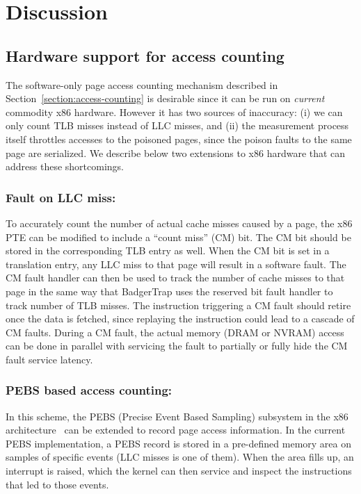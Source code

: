 \section{Discussion}
\label{discussion}

\subsection{Hardware support for access counting}
\label{counting_hardware}
The software-only page access counting mechanism described in
Section~\ref{section:access-counting} is desirable since it can be run on {\it
current} commodity x86 hardware. However it has two sources of inaccuracy: (i)
we can only count TLB misses instead of LLC misses, and (ii) the measurement
process itself throttles accesses to the poisoned pages, since the poison faults
to the same page are serialized. We describe below two extensions to x86
hardware that can address these shortcomings.

\subsubsection{Fault on LLC miss:}
To accurately count the number of actual cache misses caused by a page, the x86
PTE can be modified to include a ``count miss'' (CM) bit. The CM bit
should be stored in the corresponding TLB entry as well. When the CM bit is
set in a translation entry, any LLC miss to that page will result in a software
fault. The CM fault handler can
then be used to track the number of cache misses to that page in the same way
that BadgerTrap uses the reserved bit fault handler to track number of TLB
misses.  The instruction triggering a CM fault should retire once the data is
fetched, since replaying the instruction could lead to a cascade of CM faults.
During a CM fault, the actual memory (DRAM or NVRAM) access can be done in
parallel with servicing the fault to partially or fully hide the CM fault service
latency.

\subsubsection{PEBS based access counting:}
In this scheme, the PEBS (Precise Event Based Sampling) subsystem in the x86
architecture~\cite{Intel-sw-manual} can be extended to record page access information. In the current PEBS
implementation, a PEBS record is stored in a pre-defined memory area on samples
of specific events (LLC misses is one of them). When the area fills up, an
interrupt is raised, which the kernel can then service and inspect the
instructions that led to those events.

